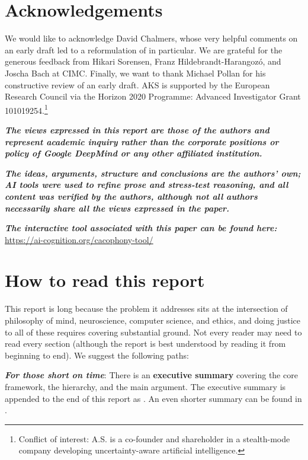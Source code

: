 \documentclass[11pt, a4paper, onecolumn, gdm]{google}
\let\samepagesection\section  %
\begin{document}
\samepagesection*{Acknowledgements}

We would like to acknowledge David Chalmers, whose very helpful comments on an early draft led to a reformulation of  in particular.
We are grateful for the generous feedback from Hikari Sorensen, Franz Hildebrandt-Harangoz\'o, and Joscha Bach at CIMC.
Finally, we want to thank Michael Pollan for his constructive review of an early draft.
AKS is supported by the European Research Council via the Horizon 2020 Programme: Advanced Investigator Grant 101019254.\footnote{Conflict of interest: A.S. is a co-founder and shareholder in a stealth-mode company developing uncertainty-aware artificial intelligence.}

\vfill

\emph{\textbf{The views expressed in this report are those of the authors and represent academic inquiry rather than the corporate positions or policy of Google DeepMind or any other affiliated institution.}}

\emph{\textbf{The ideas, arguments, structure and conclusions are the authors’ own; AI tools were used to refine prose and stress-test reasoning, and all content was verified by the authors, although not all authors necessarily share all the views expressed in the paper.}}

\emph{\textbf{The interactive tool associated with this paper can be found here: }}\url{https://ai-cognition.org/cacophony-tool/}

\section*{How to read this report}

This report is long because the problem it addresses sits at the intersection of philosophy of mind, neuroscience, computer science, and ethics, and doing justice to all of these requires covering substantial ground.
Not every reader may need to read every section (although the report is best understood by reading it from beginning to end).
We suggest the following paths:

\emph{\textbf{For those short on time}}: There is an \textbf{executive summary} covering the core framework, the hierarchy, and the main argument.
The executive summary is appended to the end of this report as . An even shorter summary can be found in .
\end{document}
